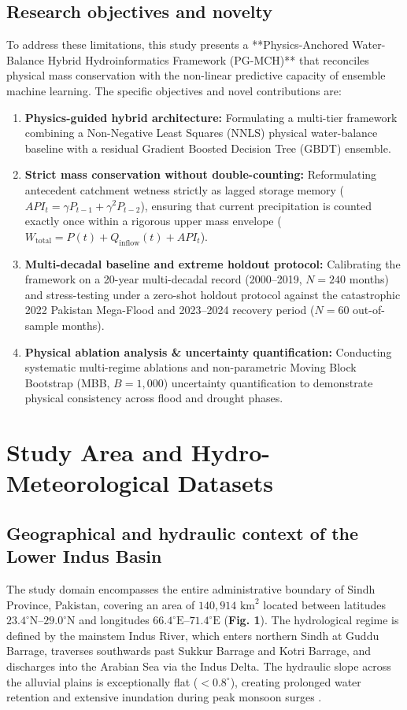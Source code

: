 \documentclass[11pt,a4paper,fleqn]{article}
\begin{document}
\subsection{Research objectives and novelty}
To address these limitations, this study presents a **Physics-Anchored Water-Balance Hybrid Hydroinformatics Framework (PG-MCH)** that reconciles physical mass conservation with the non-linear predictive capacity of ensemble machine learning. The specific objectives and novel contributions are:
\begin{enumerate}
    \item \textbf{Physics-guided hybrid architecture:} Formulating a multi-tier framework combining a Non-Negative Least Squares (NNLS) physical water-balance baseline with a residual Gradient Boosted Decision Tree (GBDT) ensemble.
    \item \textbf{Strict mass conservation without double-counting:} Reformulating antecedent catchment wetness strictly as lagged storage memory ($API_t = \gamma P_{t-1} + \gamma^2 P_{t-2}$), ensuring that current precipitation is counted exactly once within a rigorous upper mass envelope ($W_{\text{total}} = P(t) + Q_{\text{inflow}}(t) + API_t$).
    \item \textbf{Multi-decadal baseline and extreme holdout protocol:} Calibrating the framework on a 20-year multi-decadal record (2000--2019, $N=240$ months) and stress-testing under a zero-shot holdout protocol against the catastrophic 2022 Pakistan Mega-Flood and 2023--2024 recovery period ($N=60$ out-of-sample months).
    \item \textbf{Physical ablation analysis & uncertainty quantification:} Conducting systematic multi-regime ablations and non-parametric Moving Block Bootstrap (MBB, $B=1,000$) uncertainty quantification to demonstrate physical consistency across flood and drought phases.
\end{enumerate}

\section{Study Area and Hydro-Meteorological Datasets}

\subsection{Geographical and hydraulic context of the Lower Indus Basin}
The study domain encompasses the entire administrative boundary of Sindh Province, Pakistan, covering an area of $140,914\text{ km}^2$ located between latitudes $23.4^\circ\text{N}$--$29.0^\circ\text{N}$ and longitudes $66.4^\circ\text{E}$--$71.4^\circ\text{E}$ (\textbf{Fig. 1}). The hydrological regime is defined by the mainstem Indus River, which enters northern Sindh at Guddu Barrage, traverses southwards past Sukkur Barrage and Kotri Barrage, and discharges into the Arabian Sea via the Indus Delta. The hydraulic slope across the alluvial plains is exceptionally flat ($< 0.8^\circ$), creating prolonged water retention and extensive inundation during peak monsoon surges \citep{hashmi2022hydrodynamic, inam2007geographic}.
\end{document}
